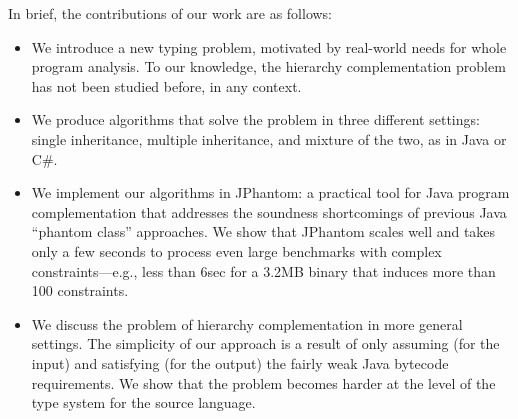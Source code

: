%

In brief, the contributions of our work are as follows:

\begin{itemize}[--]
\item We introduce a new typing problem, motivated by real-world needs
  for whole program analysis. To our knowledge, the hierarchy
  complementation problem has not been studied before, in any context.
\item We produce algorithms that solve the problem in three different
  settings: single inheritance, multiple inheritance, and mixture of
  the two, as in Java or C\#.
\item We implement our algorithms in JPhantom: a practical tool for
  Java program complementation that addresses the soundness
  shortcomings of previous Java ``phantom class'' approaches. We show
  that JPhantom scales well and takes only a few seconds to process
  even large benchmarks with complex constraints---e.g., less than
  6sec for a 3.2MB binary that induces more than 100 constraints.
\item We discuss the problem of hierarchy complementation in more
  general settings. The simplicity of our approach is a result of only
  assuming (for the input) and satisfying (for the output) the fairly
  weak Java bytecode requirements. We show that the problem becomes
  harder at the level of the type system for the source language.
\end{itemize}


